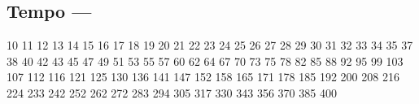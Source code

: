 \subsection[Tempo]{Tempo --- \UiKey{\I}\UiKey{\MET}}
10  
11  
12  
13  
14  
15  
16  
17  
18  
19 
20 
21 
22 
23 
24 
25 
26 
27 
28 
29 
30 
31 
32 
33 
34 
35 
37 
38 
40 
42 
43 
45 
47 
49 
51 
53 
55 
57 
60 
62 
64 
67 
70 
73 
75 
78 
82 
85 
88 
92 
95 
99 
103
107
112
116
121
125
130
136
141
147
152
158
165
171
178
185
192
200
208
216
224
233
242
252
262
272
283
294
305
317
330
343
356
370
385
400
